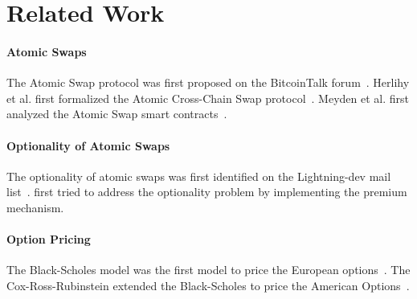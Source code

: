\section{Related Work}
\label{sec:related_work}

\paragraph{Atomic Swaps}
The Atomic Swap protocol was first proposed on the BitcoinTalk forum~\cite{nolan2013alt}.
Herlihy et al. first formalized the Atomic Cross-Chain Swap protocol~\cite{herlihy2018atomic}.
Meyden et al. first analyzed the Atomic Swap smart contracts~\cite{van2018specification}.

\paragraph{Optionality of Atomic Swaps}
The optionality of atomic swaps was first identified on the Lightning-dev mail list~\cite{optionality-origin}.
\cite{first-attempt-optionality} first tried to address the optionality problem by implementing the premium mechanism.

\paragraph{Option Pricing}
The Black-Scholes model was the first model to price the European options~\cite{black1973pricing}.
The Cox-Ross-Rubinstein extended the Black-Scholes to price the American Options~\cite{cox1979option}.